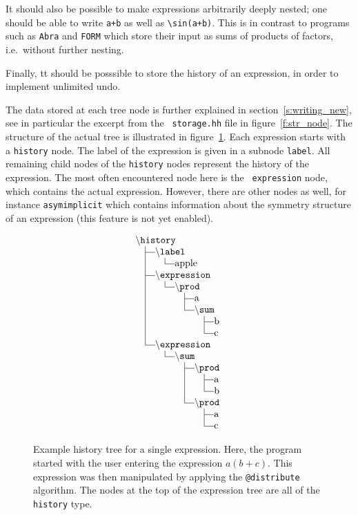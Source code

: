 \documentclass[11pt]{article}
\makeatletter
\newcommand{\subscommand}[1]{{\tt @#1}}
\newcommand{\texcommand}[1]{{\tt $\backslash$#1}}
\numberwithin{equation}{section}
\def\mystrut{\vbox to 8.5pt{}\vtop to 3.5pt{}}
\def\V{\hskip10pt\vrule\hskip10pt}
\def\T{\hskip10pt\vrule\vrule height2.5pt depth -2.1pt width 10pt}
\def\L{\hskip10pt\vrule height 8.5pt depth -2.1pt
       \vrule height2.5pt depth -2.1pt width 10pt}
\def\N{\hskip10pt\phantom{\vrule}\hskip10pt}
\makeatother
\begin{document}
It should also be possible to make expressions arbitrarily deeply
nested; one should be able to write \verb|a+b| as well as
\verb|\sin(a+b)|. This is in contrast to programs such as 
{\tt Abra} and {\tt FORM} which store their input as sums of products 
of factors, i.e.~without further nesting.

Finally, tt should be posssible to store the history of an expression,
in order to implement unlimited undo. 

The data stored at each tree node is further explained in
section~\ref{s:writing_new}, see in particular the excerpt from the {\tt
  storage.hh} file in figure~\ref{f:str_node}. The structure of the
actual tree is illustrated in figure~\ref{f:example_history}. 
Each expression starts with a {\tt history} node. The label of the
expression is given in a subnode {\tt label}. All remaining child
nodes of the {\tt history} nodes represent the history of the
expression. The most often encountered node here is the {\tt
  expression} node, which contains the actual expression. However,
there are other nodes as well, for instance {\tt asymimplicit} which
contains information about the symmetry structure of an expression
(this feature is not yet enabled).

\begin{figure}[t]
\begin{equation*}
\vcenter{\offinterlineskip
\halign{&#\mystrut\hfil\cr
\texcommand{history} \cr
\T  \texcommand{label}\cr
\V  \L  apple \cr
\T  \texcommand{expression} \cr
\V  \L  \texcommand{prod} \cr
\V  \N \T  a \cr
\V  \N \L  \texcommand{sum} \cr
\V  \N \N \T  b \cr
\V  \N \N \L  c \cr
\L  \texcommand{expression} \cr
\N  \L  \texcommand{sum} \cr
\N  \N  \T  \texcommand{prod} \cr
\N  \N  \V  \T  a \cr
\N  \N  \V  \L  b \cr
\N  \N  \L  \texcommand{prod} \cr
\N  \N  \N  \T  a \cr
\N  \N  \N  \L  c \cr }}
\end{equation*}
\caption{Example history tree for a single expression.  Here, the
program started with the user entering the expression $a (b+c)$. This
expression was then manipulated by applying the
\subscommand{distribute} algorithm. The nodes at the top of the
expression tree are all of the {\tt history} type.
\label{f:example_history}}
\end{figure}
\end{document}
